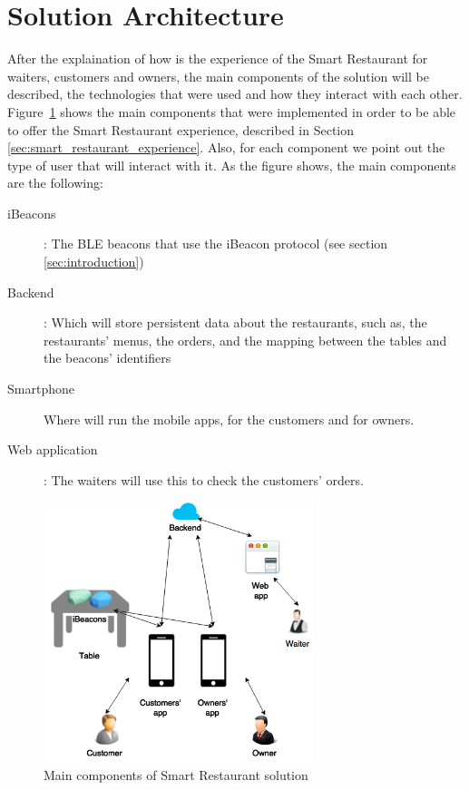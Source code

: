 
\section{Solution Architecture}
\label{sec:solution_architecture}
After the explaination of how is the experience of the
Smart Restaurant for waiters,
customers and owners, the main components of the solution will be described,
the technologies that were used and how they interact with each other.
Figure~\ref{fig:architecture_base} shows the main components that were
implemented in order to be able to offer the Smart Restaurant experience,
described in Section \ref{sec:smart_restaurant_experience}.
Also, for each component we point out the type of user that will interact
with it.
As the figure shows, the main components are the following:
\begin{description}
  \item[iBeacons]: The BLE beacons that use the iBeacon protocol (see
  section \ref{sec:introduction})
  \item[Backend]: Which will store persistent data about the restaurants,
  such as, the restaurants' menus, the orders, and the mapping between
  the tables and the beacons' identifiers
  \item[Smartphone] Where will run the mobile apps, for the customers
  and for owners.
  \item[Web application]: The waiters will use this to check the
  customers' orders.
\end{description}

\begin{figure}[!ht]
  \centering
    \includegraphics[width=0.7\textwidth]{figures/architecture_base}
    \caption{Main components of Smart Restaurant solution}
    \label{fig:architecture_base}
\end{figure}

